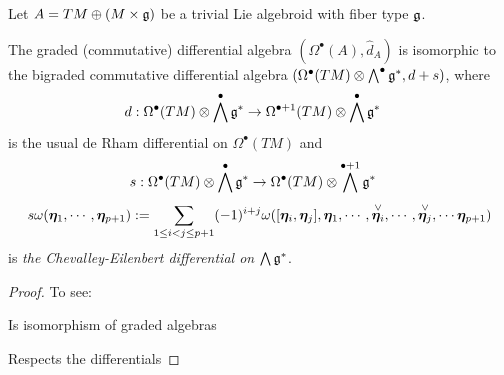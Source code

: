 Let $A = TM \oplus (M \times \mathfrak{g})$ be a trivial Lie algebroid with fiber type $\mathfrak{g}$.

\begin{theorem}
The graded (commutative) differential algebra $(\Omega^\bullet(A), \hat d_A)$ is isomorphic to the bigraded commutative differential algebra $(\Omega^\bullet(TM) \otimes \bigwedge^\bullet \mathfrak{g}^*, d + s)$, where
\begin{align}
    d: \Omega^\bullet(TM) \otimes \bigwedge^\bullet \mathfrak{g}^* &\to \Omega^{\bullet+1}(TM) \otimes \bigwedge^\bullet \mathfrak{g}^*
\end{align}
is the usual de Rham differential on $\Omega^\bullet(TM)$ and
\begin{align*}
    s: \Omega^\bullet(TM) \otimes \bigwedge^\bullet \mathfrak{g}^* &\to \Omega^\bullet(TM) \otimes \bigwedge^{\bullet+1} \mathfrak{g}^*
\end{align*}
\begin{multline}
    s\omega(\bm{\eta}_1, \cdots, \bm{\eta}_{p+1}) := \sum_{1 \leq i < j \leq p+1} (-1)^{i+j} \omega([\bm{\eta}_i, \bm{\eta}_j], \bm{\eta}_1, \cdots, \overset{\vee}{\bm{\eta}_i}, \cdots, \overset{\vee}{\bm{\eta}_j}, \cdots \bm{\eta}_{p+1})
\end{multline}
is \emph{the Chevalley-Eilenbert differential on $\bigwedge \mathfrak{g}^*$}.
\end{theorem}

\begin{proof}
To see:

Is isomorphism of graded algebras

Respects the differentials
\end{proof}

